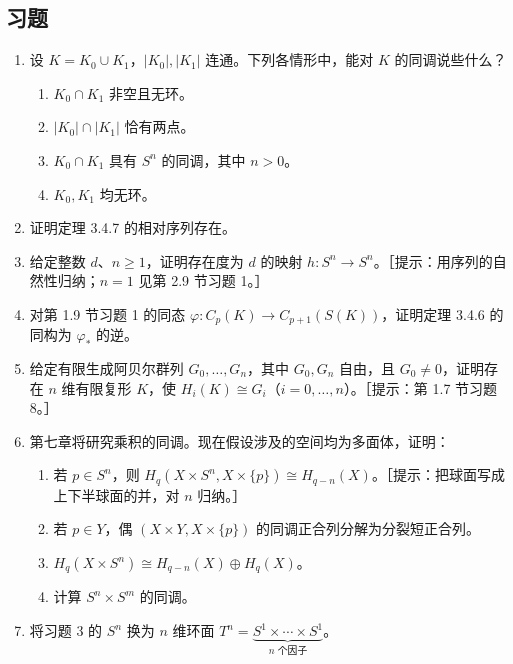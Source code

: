 \subsection*{习题}
\begin{enumerate}
\item 设 $K=K_0\cup K_1$，$|K_0|,|K_1|$ 连通。下列各情形中，能对 $K$ 的同调说些什么？
\begin{enumerate}[label=(\alph*)]
\item $K_0\cap K_1$ 非空且无环。
\item $|K_0|\cap|K_1|$ 恰有两点。
\item $K_0\cap K_1$ 具有 $S^n$ 的同调，其中 $n>0$。
\item $K_0,K_1$ 均无环。
\end{enumerate}
\item 证明定理 3.4.7 的相对序列存在。
\item 给定整数 $d$、$n\geq1$，证明存在度为 $d$ 的映射 $h:S^n\to S^n$。［提示：用序列的自然性归纳；$n=1$ 见第 2.9 节习题 1。］
\item 对第 1.9 节习题 1 的同态 $\varphi:C_p(K)\to C_{p+1}(S(K))$，证明定理 3.4.6 的同构为 $\varphi_*$ 的逆。
\item 给定有限生成阿贝尔群列 $G_0,\ldots,G_n$，其中 $G_0,G_n$ 自由，且 $G_0\ne0$，证明存在 $n$ 维有限复形 $K$，使 $H_i(K)\cong G_i$（$i=0,\ldots,n$）。［提示：第 1.7 节习题 8。］
\item 第七章将研究乘积的同调。现在假设涉及的空间均为多面体，证明：
\begin{enumerate}[label=(\alph*)]
\item 若 $p\in S^n$，则 $H_q(X\times S^n,X\times\{p\})\cong H_{q-n}(X)$。［提示：把球面写成上下半球面的并，对 $n$ 归纳。］
\item 若 $p\in Y$，偶 $(X\times Y,X\times\{p\})$ 的同调正合列分解为分裂短正合列。
\item $H_q(X\times S^n)\cong H_{q-n}(X)\oplus H_q(X)$。
\item 计算 $S^n\times S^m$ 的同调。
\end{enumerate}
\item 将习题 3 的 $S^n$ 换为 $n$ 维环面 $T^n=\underbrace{S^1\times\cdots\times S^1}_{n\text{ 个因子}}$。
\end{enumerate}
